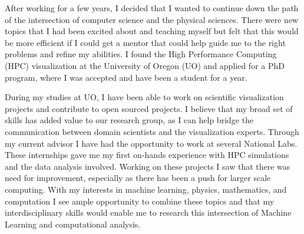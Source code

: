 \documentclass[12pt]{article}
\begin{document}
After working for a few years, I decided that I wanted to continue down the path
of the intersection of computer science and the physical sciences. There were
new topics that I had been excited about and teaching myself but felt that this
would be more efficient if I could get a mentor that could help guide me to the
right problems and refine my abilities. I found the High Performance Computing
(HPC) visualization at the University of Oregon (UO) and applied for a PhD
program, where I was accepted and have been a student for a year. 

During my studies at UO, I have been able to work on scientific visualization
projects and contribute to open sourced projects. I believe that my broad set of
skills has added value to our research group, as I can help bridge the
communication between domain scientists and the visualization experts. Through
my current advisor I have had the opportunity to work at several National Labs.
These internships gave me my first on-hands experience with HPC simulations and
the data analysis involved. Working on these projects I saw that there was need
for improvement, especially as there has been a push for larger scale computing.
With my interests in machine learning, physics, mathematics, and computation I
see ample opportunity to combine these topics and that my interdisciplinary
skills would enable me to research this intersection of Machine Learning and
computational analysis.
\end{document}
